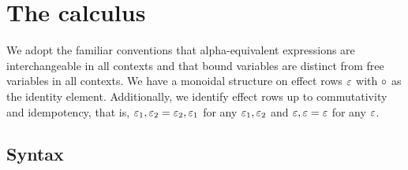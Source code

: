 \section{The calculus}

  We adopt the familiar conventions that alpha-equivalent expressions are interchangeable in all contexts and that bound variables are distinct from free variables in all contexts. We have a monoidal structure on effect rows $\varepsilon$ with $\circ$ as the identity element. Additionally, we identify effect rows up to commutativity and idempotency, that is, $\varepsilon_1, \varepsilon_2 = \varepsilon_2, \varepsilon_1$ for any $\varepsilon_1, \varepsilon_2$ and $\varepsilon, \varepsilon = \varepsilon$ for any $\varepsilon$.

  \subsection{Syntax}

